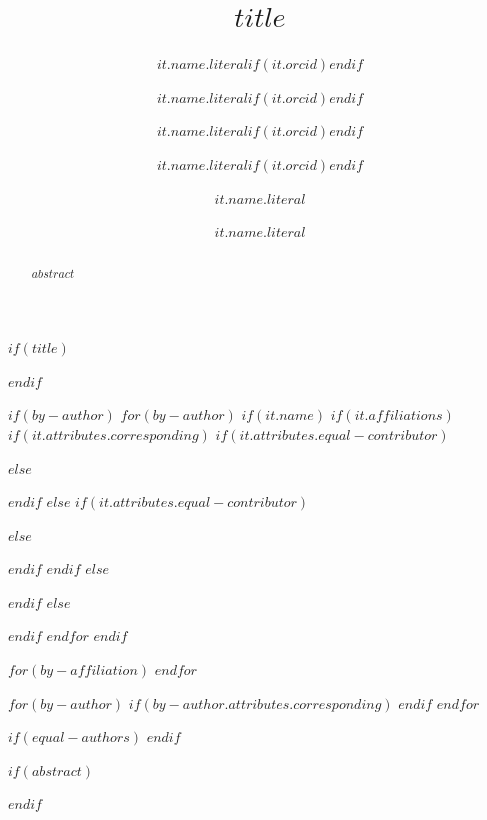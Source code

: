 $if(title)$
\title{$title$}
$endif$

$if(by-author)$
    $for(by-author)$
        $if(it.name)$
            $if(it.affiliations)$
                $if(it.attributes.corresponding)$
                    $if(it.attributes.equal-contributor)$
                        \author[$for(it.affiliations)$$it.number$$sep$,$endfor$*\dag]{$it.name.literal$$if(it.orcid)$$endif$}
                    $else$
                        \author[$for(it.affiliations)$$it.number$$sep$,$endfor$*]{$it.name.literal$$if(it.orcid)$$endif$}
                    $endif$
                $else$
                    $if(it.attributes.equal-contributor)$
                        \author[$for(it.affiliations)$$it.number$$sep$,$endfor$\dag]{$it.name.literal$$if(it.orcid)$$endif$}
                    $else$
                        \author[$for(it.affiliations)$$it.number$$sep$,$endfor$]{$it.name.literal$$if(it.orcid)$$endif$}
                    $endif$
                $endif$
            $else$
                \author[]{$it.name.literal$}
            $endif$
            $else$
            \author{$it.name.literal$}
        $endif$
    $endfor$
$endif$

$for(by-affiliation)$
$endfor$

$for(by-author)$
    $if(by-author.attributes.corresponding)$
    $endif$
$endfor$

$if(equal-authors)$
$endif$

$if(abstract)$
\begin{abstract}
$abstract$
\end{abstract}
$endif$